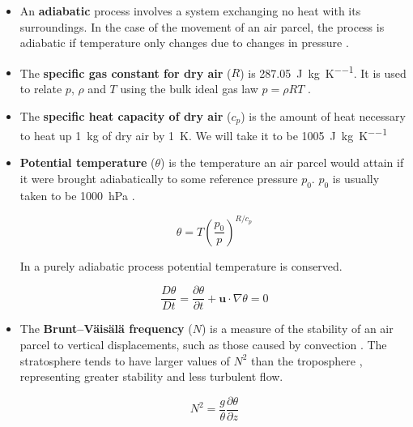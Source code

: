 \documentclass{article}
\begin{document}
\begin{itemize}
    \item An \textbf{adiabatic} process involves a system exchanging no heat with its surroundings. In the case of the movement of an air parcel, the process is adiabatic if temperature only changes due to changes in pressure \cite{Vallis2017}.
    
    \item The \textbf{specific gas constant for dry air} ($R$) is \qty{287.05}{\joule\per\kg\per\kelvin}. It is used to relate $p$, $\rho$ and $T$ using the bulk ideal gas law $p=\rho RT$ \cite{Vallis2017}.

    \item The \textbf{specific heat capacity of dry air} ($c_p$) is the amount of heat necessary to heat up \qty{1}{\kg} of dry air by \qty{1}{\kelvin}. We will take it to be \qty{1005}{\joule\per\kg\per\kelvin}

    \item
    \textbf{Potential temperature} ($\theta$) is the temperature an air parcel would attain if it were brought adiabatically to some reference pressure $p_0$.
    $p_0$ is usually taken to be \qty{1000}{\hecto\pascal} \cite{sprenger2007userguide}.
    
    \begin{equation}\label{pot_temp}
        \theta = T \left( \frac{p_0}{p}\right)^{R/c_p}
    \end{equation}

    In a purely adiabatic process potential temperature is conserved.

    \begin{equation}\label{pot_temp_conserved}
        \frac{D\theta}{Dt} = \frac{\partial \theta}{\partial t} + \bm{u} \cdot \nabla \theta = 0
    \end{equation}

    \item
    The \textbf{Brunt–Väisälä frequency} ($N$) is a measure of the stability of an air parcel to vertical displacements, such as those caused by convection \cite{sprenger2007userguide}.
    The stratosphere tends to have larger values of $N^2$ than the troposphere \cite{Barnes2022main}, representing greater stability and less turbulent flow.
    
    \begin{equation}\label{brunt_vaisala}
        N^2 = \frac{g}{\theta} \frac{\partial \theta}{\partial z}
    \end{equation}


\end{itemize}
\end{document}
